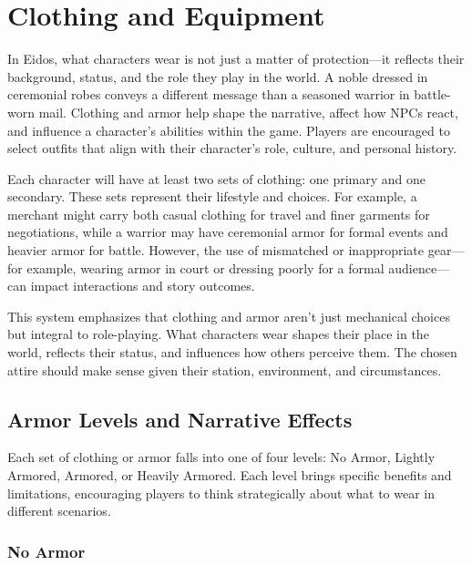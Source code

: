 \chapter{Clothing and Equipment}

In Eidos, what characters wear is not just a matter of protection—it reflects their background, status, and the role they play in the world. A noble dressed in ceremonial robes conveys a different message than a seasoned warrior in battle-worn mail. Clothing and armor help shape the narrative, affect how NPCs react, and influence a character’s abilities within the game. Players are encouraged to select outfits that align with their character’s role, culture, and personal history.

Each character will have at least two sets of clothing: one primary and one secondary. These sets represent their lifestyle and choices. For example, a merchant might carry both casual clothing for travel and finer garments for negotiations, while a warrior may have ceremonial armor for formal events and heavier armor for battle. However, the use of mismatched or inappropriate gear—for example, wearing armor in court or dressing poorly for a formal audience—can impact interactions and story outcomes.

This system emphasizes that clothing and armor aren’t just mechanical choices but integral to role-playing. What characters wear shapes their place in the world, reflects their status, and influences how others perceive them. The chosen attire should make sense given their station, environment, and circumstances.

\section{Armor Levels and Narrative Effects}

Each set of clothing or armor falls into one of four levels: No Armor, Lightly Armored, Armored, or Heavily Armored. Each level brings specific benefits and limitations, encouraging players to think strategically about what to wear in different scenarios.

\subsection*{No Armor}


